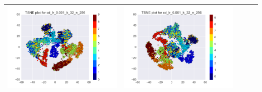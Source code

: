 \documentclass[12pt]{report}
\begin{document}
\begin{table}[H]
\begin{tabular}{ | c | c | c | c || c |}
\begin{minipage}{.3\textwidth}
      \includegraphics[scale=0.25]{cd_lr_0_001_k_32_n_256.png}
    \end{minipage} &
    \begin{minipage}{.3\textwidth}
      \includegraphics[scale=0.25]{test_cd_lr_0_001_k_32_n_256.png}
    \end{minipage}
   \\ \hline
  \end{tabular}
\end{table}
\end{document}
